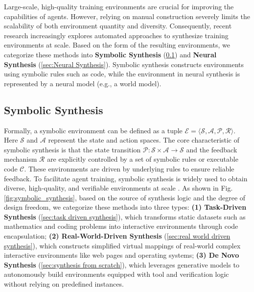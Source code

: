 
Large-scale, high-quality training environments are crucial for improving the capabilities of agents. However, relying on manual construction severely limits the scalability of both environment quantity and diversity. Consequently, recent research increasingly explores automated approaches to synthesize training environments at scale. Based on the form of the resulting environments, we categorize these methods into \textbf{Symbolic Synthesis} (\cref{sec:Symbolic Synthesis}) and \textbf{Neural Synthesis} (\cref{sec:Neural Synthesis}). Symbolic synthesis constructs environments using symbolic rules such as code, while the environment in neural synthesis is represented by a neural model (e.g., a world model).

\subsection{Symbolic Synthesis}
\label{sec:Symbolic Synthesis}

Formally, a symbolic environment can be defined as a tuple $\mathcal{E} = \langle \mathcal{S}, \mathcal{A}, \mathcal{P}, \mathcal{R} \rangle$. Here $\mathcal{S}$ and $\mathcal{A}$ represent the state and action spaces. The core characteristic of symbolic synthesis is that the state transition ${\mathcal{P}}: \mathcal{S} \times \mathcal{A} \rightarrow \mathcal{S}$ and the feedback mechanism $\mathcal{R}$ are explicitly controlled by a set of symbolic rules or executable code $\mathcal{C}$. These environments are driven by underlying rules to ensure reliable feedback. To facilitate agent training, symbolic synthesis is widely used to obtain diverse, high-quality, and verifiable environments at scale \cite{DeepSeek-V3.2, LongCat-Flash-Thinking-2601, MiMo-V2-Flash}. As shown in Fig. \ref{fig:symbolic_synthesis}, based on the source of synthesis logic and the degree of design freedom, we categorize these methods into three types: \textbf{(1) Task-Driven Synthesis} (\cref{sec:task driven synthesis}), which transforms static datasets such as mathematics and coding problems into interactive environments through code encapsulation; \textbf{(2) Real-World-Driven Synthesis} (\cref{sec:real world driven synthesis}), which constructs simplified virtual mappings of real-world complex interactive environments like web pages and operating systems; \textbf{(3) De Novo Synthesis} (\cref{sec:synthesis from scratch}), which leverages generative models to autonomously build environments equipped with tool and verification logic without relying on predefined instances.



